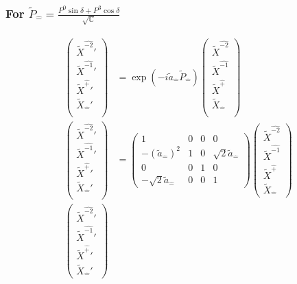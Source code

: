 \documentclass[]{article}
\numberwithin{equation}{section}
\begin{document}
{{\subsubsection{For $\tilde{P}_{\hat{-}}=\frac{P^0\sin{\delta}+P^3\cos{\delta}}{\sqrt{\mathbb{C}}}$}
\begin{align}
\begin{pmatrix}
    \tilde{X}^{\hat{-2}}'\\
    \tilde{X}^{\hat{-1}}'\\
    \tilde{X}^{\hat{+}}'\\
    \tilde{X}_{\hat{-}}'\\
    \end{pmatrix}&= \exp{(-i\tilde{a}_{\hat{-}}\tilde{P}_{\hat{-}})}\begin{pmatrix}
    \tilde{X}^{\hat{-2}}\\
    \tilde{X}^{\hat{-1}}\\
    \tilde{X}^{\hat{+}}\\
    \tilde{X}_{\hat{-}}\\
    \end{pmatrix}\\
    \begin{pmatrix}
    \tilde{X}^{\hat{-2}}'\\
    \tilde{X}^{\hat{-1}}'\\
    \tilde{X}^{\hat{+}}'\\
    \tilde{X}_{\hat{-}}'\\
    \end{pmatrix}&= \begin{pmatrix}
        1&0&0&0\\
        -(\tilde{a}_{\hat{-}})^2&1&0&\sqrt{2}\tilde{a}_{\hat{-}}\\
        0&0&1&0\\
        -\sqrt{2}\tilde{a}_{\hat{-}}&0&0&1
    \end{pmatrix}\begin{pmatrix}
    \tilde{X}^{\hat{-2}}\\
    \tilde{X}^{\hat{-1}}\\
    \tilde{X}^{\hat{+}}\\
    \tilde{X}_{\hat{-}}
    \end{pmatrix}\\
    \begin{pmatrix}
    \tilde{X}^{\hat{-2}}'\\
    \tilde{X}^{\hat{-1}}'\\
    \tilde{X}^{\hat{+}}'\\
    \tilde{X}_{\hat{-}}'

\end{pmatrix}
\end{align}}}
\end{document}
